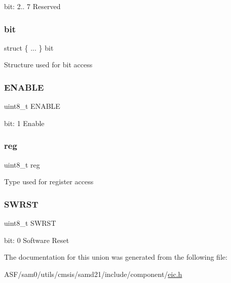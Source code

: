 bit\+: 2.. 7 Reserved \mbox{\label{union_e_i_c___c_t_r_l___type_ae0e7852e1f79d0e5824614b5381ee9ea}} 
\subsubsection{\texorpdfstring{bit}{bit}}
{\footnotesize\ttfamily struct \{ ... \}   bit}

Structure used for bit access \mbox{\label{union_e_i_c___c_t_r_l___type_a2b3662f1b123463ae1a23c1f324e5cc5}} 
\subsubsection{\texorpdfstring{ENABLE}{ENABLE}}
{\footnotesize\ttfamily uint8\+\_\+t E\+N\+A\+B\+LE}

bit\+: 1 Enable \mbox{\label{union_e_i_c___c_t_r_l___type_a9428adc9af4653a2050e2536b55dec8d}} 
\subsubsection{\texorpdfstring{reg}{reg}}
{\footnotesize\ttfamily uint8\+\_\+t reg}

Type used for register access \mbox{\label{union_e_i_c___c_t_r_l___type_a9334d5ac0548802c90a8129c52c8e490}} 
\subsubsection{\texorpdfstring{SWRST}{SWRST}}
{\footnotesize\ttfamily uint8\+\_\+t S\+W\+R\+ST}

bit\+: 0 Software Reset 

The documentation for this union was generated from the following file\+:\begin{DoxyCompactItemize}
\item 
A\+S\+F/sam0/utils/cmsis/samd21/include/component/\mbox{\hyperlink{component_2eic_8h}{eic.\+h}}\end{DoxyCompactItemize}
